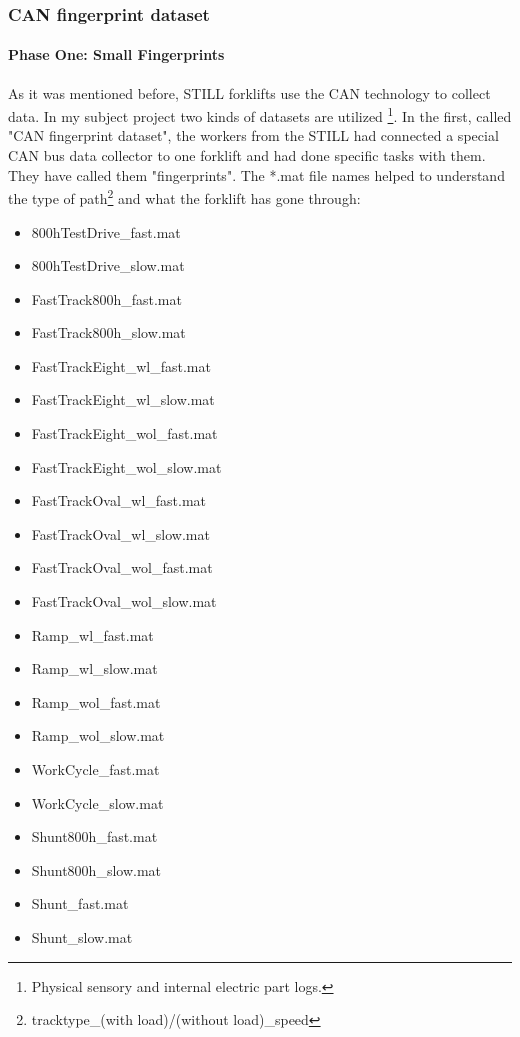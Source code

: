 			\subsubsection{CAN fingerprint dataset}
				\paragraph{Phase One: Small Fingerprints}
				\noindent
As it was mentioned before, STILL forklifts \cite{RX20} use the CAN technology \cite{CAN} to collect data. In my subject project two kinds of datasets are utilized \footnote{Physical sensory and internal electric part logs.}. In the first, called "CAN fingerprint dataset", the workers from the STILL had connected a special CAN bus data collector to one forklift and had done specific tasks with them. They have called them "fingerprints". The *.mat file names helped to understand the type of path\footnote{tracktype\_(with load)/(without load)\_speed} and what the forklift has gone through:

\begin{itemize}[noitemsep]
    \item {800hTestDrive\_fast.mat}
    \item {800hTestDrive\_slow.mat}
    \item {FastTrack800h\_fast.mat}
 	\item {FastTrack800h\_slow.mat}
	\item {FastTrackEight\_wl\_fast.mat}
	\item {FastTrackEight\_wl\_slow.mat}
	\item {FastTrackEight\_wol\_fast.mat}
	\item {FastTrackEight\_wol\_slow.mat}
  	\item {FastTrackOval\_wl\_fast.mat}
	\item {FastTrackOval\_wl\_slow.mat}
	\item {FastTrackOval\_wol\_fast.mat}
	\item {FastTrackOval\_wol\_slow.mat}
	\item {Ramp\_wl\_fast.mat} 
	\item {Ramp\_wl\_slow.mat}
	\item {Ramp\_wol\_fast.mat}
	\item {Ramp\_wol\_slow.mat}
    \item {WorkCycle\_fast.mat}
    \item {WorkCycle\_slow.mat}
	\item {Shunt800h\_fast.mat}  	
  	\item {Shunt800h\_slow.mat}
 	\item {Shunt\_fast.mat} 	
 	\item {Shunt\_slow.mat}
\end{itemize}

